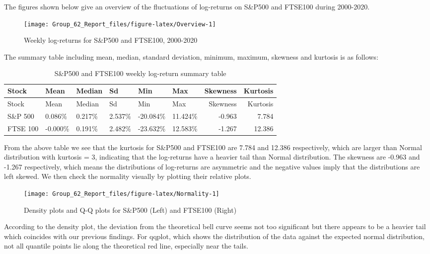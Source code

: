 \documentclass[]{article}
\begin{document}
The figures shown below give an overview of the fluctuations of
log-returns on S\&P500 and FTSE100 during 2000-2020.

\begin{figure}

{\centering \texttt{[image: Group\_62\_Report\_files/figure-latex/Overview-1]} 

}

\caption{Weekly log-returns for S\&P500 and FTSE100, 2000-2020}\label{fig:Overview}
\end{figure}

The summary table including mean, median, standard deviation, minimum,
maximum, skewness and kurtosis is as follows:

\begin{longtable}[]{@{}llllllrr@{}}
\caption{S\&P500 and FTSE100 weekly log-return summary
table}\tabularnewline
\toprule
Stock & Mean & Median & Sd & Min & Max & Skewness &
Kurtosis\tabularnewline
\midrule
\endfirsthead
\toprule
Stock & Mean & Median & Sd & Min & Max & Skewness &
Kurtosis\tabularnewline
\midrule
\endhead
S\&P 500 & 0.086\% & 0.217\% & 2.537\% & -20.084\% & 11.424\% & -0.963 &
7.784\tabularnewline
FTSE 100 & -0.000\% & 0.191\% & 2.482\% & -23.632\% & 12.583\% & -1.267
& 12.386\tabularnewline
\bottomrule
\end{longtable}

\newpage

From the above table we see that the kurtosis for S\&P500 and FTSE100
are 7.784 and 12.386 respectively, which are larger than Normal
distribution with kurtosis = 3, indicating that the log-returns have a
heavier tail than Normal distribution. The skewness are -0.963 and
-1.267 respectively, which means the distributions of log-returns are
asymmetric and the negative values imply that the distributions are left
skewed. We then check the normality visually by plotting their relative
plots.

\begin{figure}

{\centering \texttt{[image: Group\_62\_Report\_files/figure-latex/Normality-1]} 

}

\caption{Density plots and Q-Q plots for S\&P500 (Left) and FTSE100 (Right)}\label{fig:Normality}
\end{figure}

According to the density plot, the deviation from the theoretical bell
curve seems not too significant but there appears to be a heavier tail
which coincides with our previous findings. For qqplot, which shows the
distribution of the data against the expected normal distribution, not
all quantile points lie along the theoretical red line, especially near
the tails.
\end{document}
